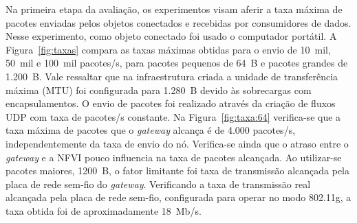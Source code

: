 \documentclass[12pt]{article}
\begin{document}
Na primeira etapa da avaliação, os experimentos visam aferir a taxa máxima de pacotes enviadas pelos objetos conectados e recebidas por consumidores de dados. Nesse experimento, como objeto conectado foi usado o computador portátil. A Figura~\ref{fig:taxas} compara as taxas máximas obtidas para o envio de 10~mil, 50~mil e 100~mil pacotes/s, para pacotes pequenos de 64~B e pacotes grandes de 1.200~B. Vale ressaltar que na infraestrutura criada a unidade de transferência máxima (MTU) foi configurada para 1.280~B devido às sobrecargas com encapsulamentos. O envio de pacotes foi realizado através da criação de fluxos UDP com taxa de pacotes/s constante. Na Figura~\ref{fig:taxa:64} verifica-se que a taxa máxima de pacotes que o \textit{gateway} alcança é de 4.000 pacotes/s, independentemente da taxa de envio do nó. Verifica-se ainda que o atraso entre o \textit{gateway} e a NFVI pouco influencia na taxa de pacotes alcançada. Ao utilizar-se pacotes maiores, 1200~B, o fator limitante foi taxa de transmissão alcançada pela placa de rede sem-fio do \textit{gateway}. Verificando a taxa de transmissão real alcançada pela placa de rede sem-fio, configurada para operar no modo 802.11g, a taxa obtida foi de aproximadamente 18~Mb/s.

\begin{figure*}[tb!]
\begin{center}
\hspace{-2mm}
\mbox{
}
\hspace{-2mm}
\mbox{
}
\end{center}
\vspace{-3mm}
\caption{Taxa de pacotes de recebidas pelo consumidor de dados ao realizar envios em taxas superiores à capacidade do enlace sem-fio. O atraso entre o \textit{gateway} e a infraestrutura de virtualização de rede não influencia nas taxas alcançadas. Os experimentos foram realizados com fluxos UDP com pacotes pequenos (a) 64 bytes e pacotes grandes (b) 1200 bytes.}
\label{fig:taxas}
\vspace{-3mm}
\end{figure*}
\end{document}
